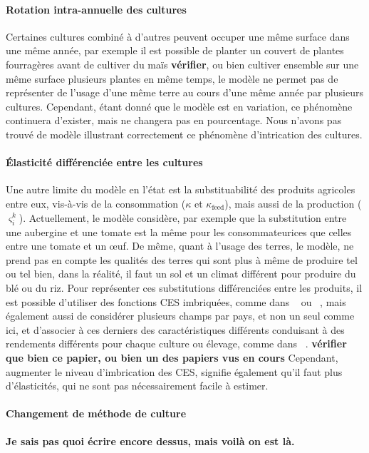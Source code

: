 \paragraph{Rotation intra-annuelle des cultures} Certaines cultures combiné à d’autres peuvent occuper une même surface dans une même année, par exemple il est possible de planter un couvert de plantes fourragères avant de cultiver du maïs \textbf{vérifier}, ou bien cultiver ensemble sur une même surface plusieurs plantes en même temps, le modèle ne permet pas de représenter de l’usage d’une même terre au cours d’une même année par plusieurs cultures. Cependant, étant donné que le modèle est en variation, ce phénomène continuera d’exister, mais ne changera pas en pourcentage. Nous n’avons pas trouvé de modèle illustrant correctement ce phénomène d’intrication des cultures.

\paragraph{Élasticité différenciée entre les cultures} Une autre limite du modèle en l’état est la substituabilité des produits agricoles entre eux, vis-à-vis de la consommation ($\kappa$ et $\kappa_\text{feed}$), mais aussi de la production ($\varsigma_i^k$). Actuellement, le modèle considère, par exemple que la substitution entre une aubergine et une tomate est la même pour les consommateurices que celles entre une tomate et un œuf. De même, quant à l’usage des terres, le modèle, ne prend pas en compte les qualités des terres qui sont plus à même de produire tel ou tel bien, dans la réalité, il faut un sol et un climat différent pour produire du blé ou du riz. Pour représenter ces substitutions différenciées entre les produits, il est possible d’utiliser des fonctions CES imbriquées, comme dans ~\cite{CorreaDias2025} ou ~\cite{Valin2023}, mais également aussi de considérer plusieurs champs par pays, et non un seul comme ici, et d’associer à ces derniers des caractéristiques différents conduisant à des rendements différents pour chaque culture ou élevage, comme dans ~\cite{Gouel2021}. \textbf{vérifier que bien ce papier, ou bien un des papiers vus en cours} Cependant, augmenter le niveau d'imbrication des CES, signifie également qu'il faut plus d'élasticités, qui ne sont pas nécessairement facile à estimer.

\paragraph{Changement de méthode de culture} \textbf{Je sais pas quoi écrire encore dessus, mais voilà on est là.}
